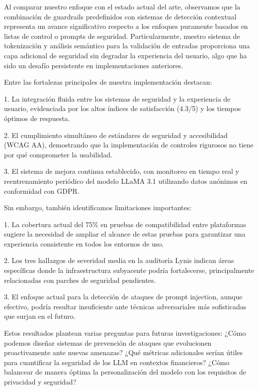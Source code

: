 \documentclass[12pt]{article}
\begin{document}
Al comparar nuestro enfoque con el estado actual del arte, observamos que la combinación de guardrails predefinidos con sistemas de detección contextual representa un avance significativo respecto a los enfoques puramente basados en listas de control o prompts de seguridad. Particularmente, nuestro sistema de tokenización y análisis semántico para la validación de entradas proporciona una capa adicional de seguridad sin degradar la experiencia del usuario, algo que ha sido un desafío persistente en implementaciones anteriores.

Entre las fortalezas principales de nuestra implementación destacan:

1. La integración fluida entre los sistemas de seguridad y la experiencia de usuario, evidenciada por los altos índices de satisfacción (4.3/5) y los tiempos óptimos de respuesta.

2. El cumplimiento simultáneo de estándares de seguridad y accesibilidad (WCAG AA), demostrando que la implementación de controles rigurosos no tiene por qué comprometer la usabilidad.

3. El sistema de mejora continua establecido, con monitoreo en tiempo real y reentrenamiento periódico del modelo LLaMA 3.1 utilizando datos anónimos en conformidad con GDPR.

Sin embargo, también identificamos limitaciones importantes:

1. La cobertura actual del 75\% en pruebas de compatibilidad entre plataformas sugiere la necesidad de ampliar el alcance de estas pruebas para garantizar una experiencia consistente en todos los entornos de uso.

2. Los tres hallazgos de severidad media en la auditoría Lynis indican áreas específicas donde la infraestructura subyacente podría fortalecerse, principalmente relacionadas con parches de seguridad pendientes.

3. El enfoque actual para la detección de ataques de prompt injection, aunque efectivo, podría resultar insuficiente ante técnicas adversariales más sofisticadas que surjan en el futuro.

Estos resultados plantean varias preguntas para futuras investigaciones: ¿Cómo podemos diseñar sistemas de prevención de ataques que evolucionen proactivamente ante nuevas amenazas? ¿Qué métricas adicionales serían útiles para cuantificar la seguridad de los LLM en contextos financieros? ¿Cómo balancear de manera óptima la personalización del modelo con los requisitos de privacidad y seguridad?
\end{document}
